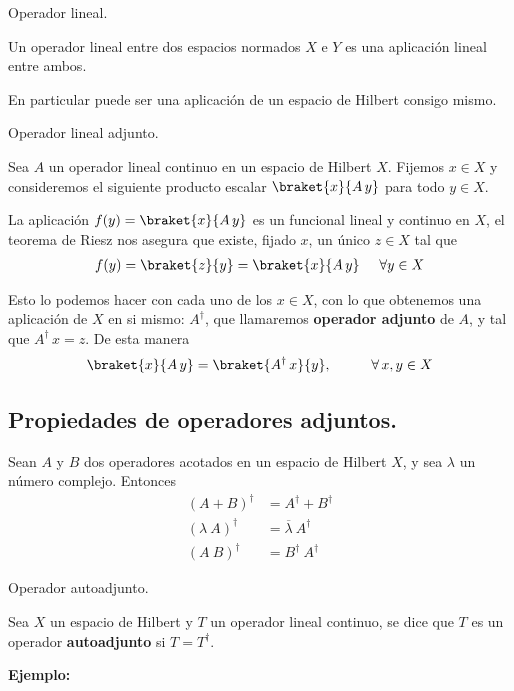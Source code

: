 \begin{defi} Operador lineal.

Un operador lineal entre dos espacios normados $X$ e $Y$ es una aplicación lineal entre ambos.

En particular puede ser una aplicación de un espacio de Hilbert consigo mismo.
\end{defi}
\begin{defi} Operador lineal adjunto.

Sea $A$ un operador lineal continuo en un espacio de Hilbert $X$.
Fijemos $x \in X$ y consideremos el siguiente producto escalar $\braket{x}{A \, y}$ para todo $y \in X$.

La aplicación $f(y) = \braket{x}{A \, y}$ es un funcional lineal y continuo en $X$, el teorema de Riesz nos asegura que existe, fijado $x$, un único $z \in X$ tal que
\begin{align*} f(y) = \braket{z}{y} = \braket{x}{A \, y} \hspace{0.5cm} \forall y \in X \end{align*}

Esto lo podemos hacer con cada uno de los $x \in X$, con lo que obtenemos una aplicación de $X$ en si mismo: $A^{\dagger}$, que llamaremos \textbf{operador adjunto} de $A$, y tal que $A^{\dagger} \, x = z$. De esta manera
\begin{align*} \braket{x}{A \, y} = \braket{A^{\dagger} \, x}{y}, \hspace{1cm} \forall \, x, y \in X \end{align*}
\end{defi}

\subsection*{Propiedades de operadores adjuntos.}

Sean $A$ y $B$ dos operadores acotados en un espacio de Hilbert $X$, y sea $\lambda$ un número complejo. Entonces
\begin{align*}
(A + B)^{\dagger} &= A^{\dagger} + B^{\dagger} \\
(\lambda \: A)^{\dagger} &= \overline{\lambda} \: A^{\dagger} \\
(A \: B)^{\dagger} &= B^{\dagger} \: A^{\dagger}
\end{align*}
\begin{defi} Operador autoadjunto.

Sea $X$ un espacio de Hilbert y $T$ un operador lineal continuo, se dice que $T$ es un operador \textbf{autoadjunto} si $T = T^{\dagger}$.
\end{defi}
\textbf{Ejemplo:}

